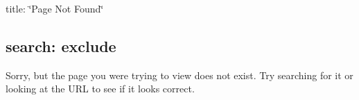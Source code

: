 

 title\+: \char`\"{}\+Page Not Found\char`\"{} \subsection*{search\+: exclude }

Sorry, but the page you were trying to view does not exist. Try searching for it or looking at the U\+RL to see if it looks correct. 